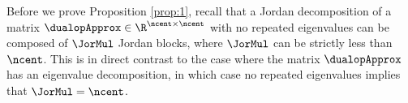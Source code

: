 Before we prove Proposition \ref{prop:1}, recall that a Jordan decomposition of a matrix $\dualopApprox\in\R^{\ncent\times\ncent}$ with no repeated eigenvalues can be composed of $\JorMul$ Jordan blocks, where $\JorMul$ can be strictly less than $\ncent$. This is in direct contrast to the case where the matrix $\dualopApprox$ has an eigenvalue decomposition, in which case no repeated eigenvalues implies that $\JorMul = \ncent$.  
